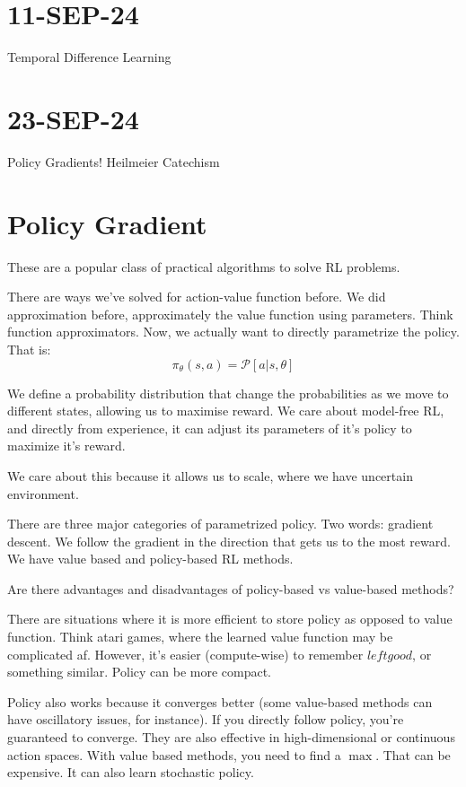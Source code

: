 \documentclass[10pt, oneside]{article}
\theoremstyle{definition}
\begin{document}
\section{11-SEP-24}
Temporal Difference Learning

\section{23-SEP-24}
Policy Gradients!
Heilmeier Catechism


\section{Policy Gradient}
These are a popular class of practical algorithms to solve RL problems.

There are ways we've solved for action-value function before. We did approximation before, approximately the value function using parameters. Think function approximators. Now, we actually want to directly parametrize the policy. That is:
\[\pi_\theta(s,a) = \mathcal{P}[a | s,\theta] \]

We define a probability distribution that change the probabilities as we move to different states, allowing us to maximise reward. We care about model-free RL, and directly from experience, it can adjust its parameters of it's policy to maximize it's reward. 

We care about this because it allows us to scale, where we have uncertain environment. 

There are three major categories of parametrized policy. Two words: gradient descent. We follow the gradient in the direction that gets us to the most reward. We have value based and policy-based RL methods. 

Are there advantages and disadvantages of policy-based vs value-based methods?

There are situations where it is more efficient to store policy as opposed to value function. Think atari games, where the learned value function may be complicated af. However, it's easier (compute-wise) to remember $left good$, or something similar. Policy can be more compact.

Policy also works because it converges better (some value-based methods can have oscillatory issues, for instance). If you directly follow policy, you're guaranteed to converge. They are also effective in high-dimensional or continuous action spaces. With value based methods, you need to find a $\max$. That can be expensive. It can also learn stochastic policy.
\end{document}
